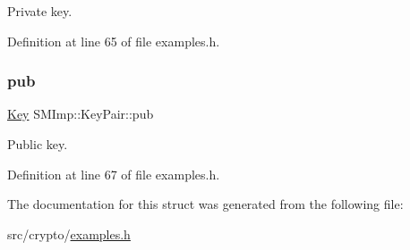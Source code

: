 Private key. 



Definition at line 65 of file examples.\+h.

\mbox{\label{structSMImp_1_1KeyPair_acb11a05be94b45f5f2b4ee7a78884e4c}} 
\subsubsection{\texorpdfstring{pub}{pub}}
{\footnotesize\ttfamily \hyperlink{structSMImp_1_1Key}{Key} S\+M\+Imp\+::\+Key\+Pair\+::pub}



Public key. 



Definition at line 67 of file examples.\+h.



The documentation for this struct was generated from the following file\+:\begin{DoxyCompactItemize}
\item 
src/crypto/\hyperlink{examples_8h}{examples.\+h}\end{DoxyCompactItemize}

